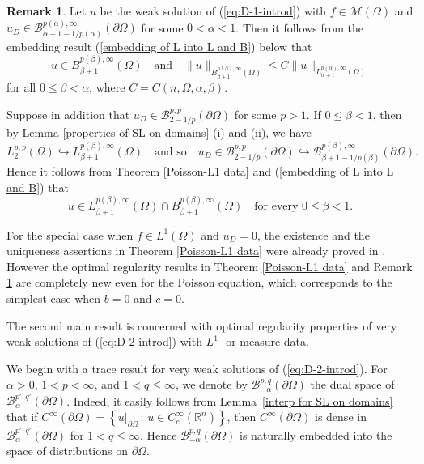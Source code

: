 \documentclass[reqno,centertags,11pt]{amsart}
\theoremstyle{definition}
\newtheorem{rmk}[thm]{Remark}
\numberwithin{thm}{section}
\numberwithin{equation}{section}
\newcommand{\R}{{\mathbb{R}}}
\begin{document}
\begin{rmk}\label{rmk-main1} Let $u$  be the weak solution of (\ref{eq:D-1-introd}) with $ f\in \mathcal{M}  (\Omega )$ and $u_D \in \mathcal B^{p(\alpha ),\infty}_{\alpha +1 -1/p (\alpha )}(\partial \Omega )$ for some  $0 <  \alpha <1$. Then it follows from the embedding result (\ref{embedding of L into L and B})  below    that
\[
u \in   B_{\beta +1}^{p(\beta) ,\infty}(\Omega )
 \quad\mbox{and}\quad
 \|   u \|_{  B_{\beta +1}^{p(\beta) ,\infty}(\Omega  )} \le C \|   u \|_{L_{\alpha +1}^{p(\alpha) ,\infty}(\Omega ) }
\]
for all   $0\le \beta < \alpha$,   where   $C=C(n , \Omega ,\alpha , \beta )$.

Suppose in addition that $u_D \in \mathcal B^{p,p}_{2 -1/p}(\partial \Omega )  $   for some $p>1$.
If  $0 \le  \beta <1$, then  by    Lemma \ref{properties of SL on domains} (i) and (ii), we have
$$
L_2^{p,p}(\Omega ) \hookrightarrow L_{\beta +1}^{p(\beta) ,\infty}(\Omega  ) \quad\mbox{and so}\quad u_D \in \mathcal B^{p,p}_{2 -1/p}(\partial \Omega ) \hookrightarrow \mathcal B^{p(\beta ),\infty}_{\beta +1 -1/p (\beta )}(\partial \Omega ).
$$
Hence it follows from Theorem   \ref{Poisson-L1 data} and (\ref{embedding of L into L and B}) that
\[
u \in L_{\beta +1}^{p(\beta) ,\infty}(\Omega  ) \cap B_{\beta +1}^{p(\beta) ,\infty}(\Omega )
\quad\mbox{for every}\,\, 0 \le \beta < 1.
\]
\end{rmk}

For the  special case when $f \in L^1 (\Omega )$ and $u_D =0$, the existence and the uniqueness assertions in Theorem   \ref{Poisson-L1 data} were already proved    in \cite[Corollary 1.1]{KO}. However the optimal regularity results in Theorem   \ref{Poisson-L1 data} and Remark \ref{rmk-main1} are  completely  new even for   the Poisson equation, which corresponds to the simplest case when $b =0$ and   $c=0$.



\vspace{0.3cm}

The second main result is concerned with optimal regularity properties of  very weak solutions  of (\ref{eq:D-2-introd}) with $L^1$- or measure data.

We begin with   a trace result for very weak solutions of (\ref{eq:D-2-introd}). For $\alpha>0$, $1<p<\infty$, and $1 < q \le \infty$, we denote by  $\mathcal{B}_{-\alpha}^{p,q}(\partial\Omega )$    the dual space of $\mathcal{B}_{\alpha}^{p' ,q'}(\partial\Omega )$.
Indeed, it easily follows from Lemma~\ref{interp for SL on domains}    that if $C^\infty (\partial\Omega ) = \left\{  u|_{\partial\Omega}\,:\, u \in C_c^\infty (\R^n ) \right\}$, then $C^\infty (\partial\Omega )$ is dense in  $\mathcal B^{p',q'}_{\alpha}(\partial \Omega )$ for   $ 1< q \le \infty$.
Hence   $\mathcal{B}_{-\alpha}^{p,q}(\partial\Omega )$ is naturally embedded into the space of distributions on $\partial\Omega$.
\end{document}

